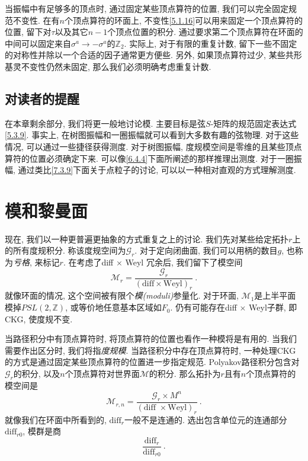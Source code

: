 当振幅中有足够多的顶点时, 通过固定某些顶点算符的位置, 我们可以完全固定规范不变性. 在有$n$个顶点算符的环面上, 不变性\eqref{5.1.16}可以用来固定一个顶点算符的位置, 
留下对$\tau$以及其它$n-1$个顶点位置的积分. 通过要求第二个顶点算符在环面的中间可以固定来自$\sigma^{a} \rightarrow-\sigma^{a}$的$\mathds{Z}_{2}$. 
实际上, 对于有限的重复计数, 留下一些不固定的对称性并除以一个合适的因子通常更方便些. 另外, 如果顶点算符过少, 某些共形基灵不变性仍然未固定, 那么我们必须明确考虑重复计数.

\subsection*{对读者的提醒}
在本章剩余部分, 我们将更一般地讨论模. 主要目标是弦$S$-矩阵的规范固定表达式\eqref{5.3.9}. 事实上, 在树图振幅和一圈振幅就可以看到大多数有趣的弦物理. 
对于这些情况, 可以通过一些捷径获得测度. 对于树图振幅, 度规模空间是零维的且某些顶点算符的位置必须确定下来. 可以像\eqref{6.4.4}下面所阐述的那样推理出测度. 对于一圈振幅, 
通过类比\eqref{7.3.9}下面关于点粒子的讨论, 可以以一种相对直观的方式理解测度. 

\section{\texorpdfstring{模和黎曼面}{5.2 Moduli and 黎曼 surfaces}} \label{sec:5.2}

现在, 我们以一种更普遍更抽象的方式重复之上的讨论. 我们先对某些给定拓扑$r$上的所有度规积分. 称该度规空间为$\mathscr{G}_{r}$. 对于定向闭曲面, 我们可以用柄的数目$g$, 
也称为\emph{亏格}, 来标记$r$. 在考虑了diff $\times$ Weyl 冗余后, 我们留下了模空间
\begin{equation}
	\mathscr{M}_{r}=\frac{\mathscr{G}_{r}}{(\text{diff} \times \mathrm{Weyl})_{r}} \:.  \label{5.2.1}
\end{equation}
就像环面的情况, 这个空间被有限个\emph{模(moduli)}参量化. 对于环面, $\mathscr{M}_{1}$是上半平面模掉$PSL(2, \mathds{Z})$, 或等价地任意基本区域如$F_{0}$. 
仍有可能存在diff $\times$ Weyl子群, 即CKG, 使度规不变.

当路径积分中有顶点算符时, 将顶点算符的位置也看作一种模将是有用的. 当我们需要作出区分时, 我们将指\emph{度规模}. 当路径积分中存在顶点算符时, 
一种处理CKG的方式是通过固定某些顶点算符的位置进一步指定规范. Polyakov路径积分包含对$\mathscr{G}_{r}$的积分, 以及$n$个顶点算符对世界面$\mathscr{M}$的积分. 
那么拓扑为$r$且有$n$个顶点算符的模空间是
\begin{equation}
	\mathscr{M}_{r, n}=\frac{\mathscr{G}_{r} \times M^{n}}{(\text{diff } \times \mathrm{Weyl})_{r}} \:. \label{5.2.2}
\end{equation}
\newpage
就像我们在环面中所看到的, $\text{diff}_{r}$一般不是连通的. 选出包含单位元的连通部分$\text{diff}_{r 0}$, 模群是商
\begin{equation}
	\frac{\text{diff}_{r}}{\text{diff}_{r 0}} \:. \label{5.2.3}
\end{equation}

